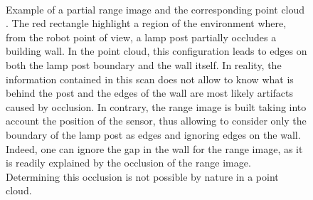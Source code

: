 \begin{figure}
    \centering
    \\
    \caption[Example of a partial range image and the corresponding point cloud with an example of edge caused by an object border.]{Example of a partial range image \protect{} and the corresponding point cloud \protect{}. The red rectangle highlight a region of the environment where, from the robot point of view, a lamp post partially occludes a building wall. In the point cloud, this configuration leads to edges on both the lamp post boundary and the wall itself. In reality, the information contained in this scan does not allow to know what is behind the post and the edges of the wall are most likely artifacts caused by occlusion. In contrary, the range image is built taking into account the position of the sensor, thus allowing to consider only the boundary of the lamp post as edges and ignoring edges on the wall. Indeed, one can ignore the gap in the wall for the range image, as it is readily explained by the occlusion of the range image. Determining this occlusion is not possible by nature in a point cloud.}
    \label{fig:chap_slam_edges}
\end{figure}

